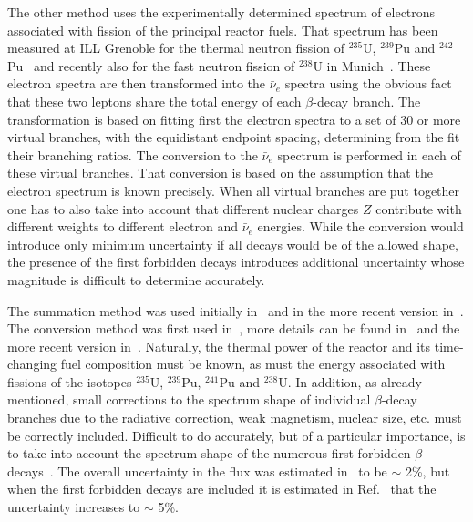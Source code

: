 \documentclass[aps,twocolumn,preprintnumbers,amsmath,superscriptaddress,amssymb,floats,nofootinbib]{revtex4-1}
\begin{document}
 The other method uses the experimentally determined spectrum of electrons associated with fission of the principal reactor fuels. That spectrum has been 
 measured at ILL Grenoble for the thermal neutron fission of $^{235}$U, $^{239}$Pu and $^{242}$Pu~\cite{vonFeilitzsch,Schreckenbach,Hahn} and recently also for the fast neutron fission of $^{238}$U
 in Munich~\cite{Haag}. These electron spectra are then transformed into the $\bar{\nu}_e$ spectra using the obvious fact that these two leptons share the total energy
 of each $\beta$-decay branch. The transformation is based on fitting first the electron spectra to a set of 30 or more virtual branches, with the equidistant
 endpoint spacing, determining from the fit their branching ratios. 
 The conversion to the $\bar{\nu}_e$ spectrum is performed in each of these virtual branches. That conversion is based on the assumption 
 that the electron spectrum is known precisely.
 When all virtual branches are put together one has to also take into account that different nuclear charges $Z$ 
 contribute with different weights to different electron
 and $\bar{\nu}_e$ energies.
 While the conversion would introduce only minimum uncertainty if all decays would be of the allowed shape, the presence
 of the first forbidden decays introduces additional uncertainty whose magnitude is difficult to determine accurately.

The summation method was used
initially in~\cite{Davis,Vogel81,Klapdor-Pu,Klapdor-U,Kopeikin} and in the more recent version in~\cite{Mueller}. 
The conversion method was first used in~\cite{vonFeilitzsch,Schreckenbach,Hahn}, more details can be found in~\cite{Vogel07} and the more recent version in~\cite{Huber}.
Naturally, the thermal power of the reactor and its time-changing fuel composition must be known, as must the 
energy associated with fissions of the isotopes $^{235}$U, $^{239}$Pu, $^{241}$Pu
and $^{238}$U. In addition, as already mentioned, small corrections to the spectrum shape of individual $\beta$-decay branches due to the radiative correction, weak magnetism,
nuclear size,
etc. must be correctly included. Difficult to do accurately, but of a particular importance, is to take into account the spectrum shape of the numerous
first forbidden $\beta$ decays~\cite{Hayes}. The overall uncertainty in the flux was estimated in~\cite{Mueller, Huber} to be $\sim$ 2\%, but when the
first forbidden decays are included it is estimated in Ref.~\cite{Hayes} that the uncertainty increases to $\sim$ 5\%.
\end{document}

